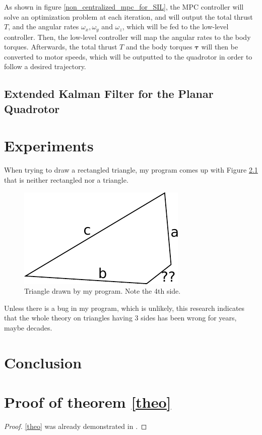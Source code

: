 \documentclass{thesisreport}
\begin{document}
As shown in figure \ref{non_centralized_mpc_for_SIL}, the MPC controller will solve an optimization problem at each iteration, and will output the total thrust $T$, and the angular rates $\omega_x, \omega_y$ and $\omega_z$, which will be fed to the low-level controller. Then, the low-level controller will map the angular rates to the body torques. Afterwards, the total thrust $T$ and the body torques $\bm{\tau}$ will then be converted to motor speeds, which will be outputted to the quadrotor in order to follow a desired trajectory.

\section{Extended Kalman Filter for the Planar Quadrotor}



 \chapter{Experiments}
 
 When trying to draw a rectangled triangle, my program comes up with Figure \ref{triangle2} that is neither rectangled nor a triangle.
 
  \begin{figure}[h]\centering
  \includegraphics[width=.5\linewidth]{triangle2}
  \caption{Triangle drawn by my program. Note the 4th side.} \label{triangle2}
 \end{figure}
 
Unless there is a bug in my program, which is unlikely, this research indicates that the whole theory on triangles having 3 sides has been wrong for years, maybe decades.
 
 \chapter*{Conclusion}
 
 
 
 
 
 \appendix	
 
 \chapter{Proof of theorem \ref{theo}}
 \label{sec:prooftheorem}
 
 
 \begin{proof}
\eqref{theo} was already demonstrated in \cite{euclides300}.
\end{proof}
 
 
 
 
 
 
 
\end{document}
